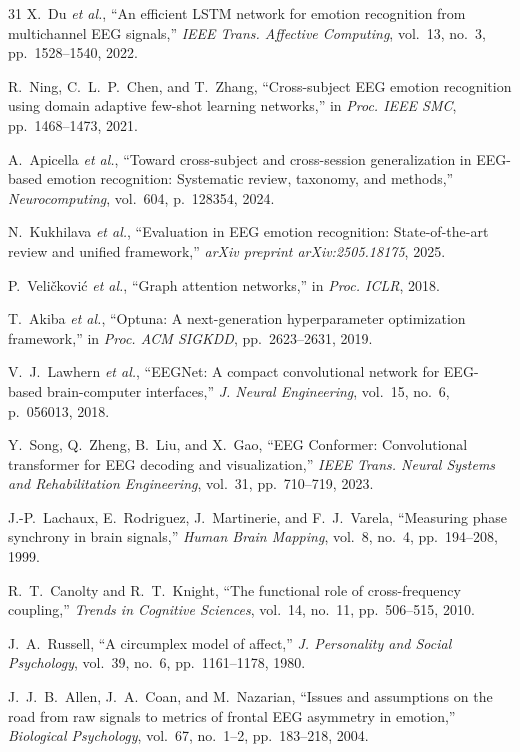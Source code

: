 \documentclass[conference,a4paper]{IEEEtran}
\begin{document}
\begin{thebibliography}{31}
X.~Du \emph{et al.}, ``An efficient LSTM network for emotion recognition from multichannel EEG signals,'' \emph{IEEE Trans. Affective Computing}, vol.~13, no.~3, pp.~1528--1540, 2022.

R.~Ning, C.~L.~P.~Chen, and T.~Zhang, ``Cross-subject EEG emotion recognition using domain adaptive few-shot learning networks,'' in \emph{Proc. IEEE SMC}, pp.~1468--1473, 2021.

A.~Apicella \emph{et al.}, ``Toward cross-subject and cross-session generalization in EEG-based emotion recognition: Systematic review, taxonomy, and methods,'' \emph{Neurocomputing}, vol.~604, p.~128354, 2024.

N.~Kukhilava \emph{et al.}, ``Evaluation in EEG emotion recognition: State-of-the-art review and unified framework,'' \emph{arXiv preprint arXiv:2505.18175}, 2025.

P.~Veli\v{c}kovi\'{c} \emph{et al.}, ``Graph attention networks,'' in \emph{Proc. ICLR}, 2018.

T.~Akiba \emph{et al.}, ``Optuna: A next-generation hyperparameter optimization framework,'' in \emph{Proc. ACM SIGKDD}, pp.~2623--2631, 2019.

V.~J.~Lawhern \emph{et al.}, ``EEGNet: A compact convolutional network for EEG-based brain-computer interfaces,'' \emph{J. Neural Engineering}, vol.~15, no.~6, p.~056013, 2018.

Y.~Song, Q.~Zheng, B.~Liu, and X.~Gao, ``EEG Conformer: Convolutional transformer for EEG decoding and visualization,'' \emph{IEEE Trans. Neural Systems and Rehabilitation Engineering}, vol.~31, pp.~710--719, 2023.

J.-P.~Lachaux, E.~Rodriguez, J.~Martinerie, and F.~J.~Varela, ``Measuring phase synchrony in brain signals,'' \emph{Human Brain Mapping}, vol.~8, no.~4, pp.~194--208, 1999.

R.~T.~Canolty and R.~T.~Knight, ``The functional role of cross-frequency coupling,'' \emph{Trends in Cognitive Sciences}, vol.~14, no.~11, pp.~506--515, 2010.

J.~A.~Russell, ``A circumplex model of affect,'' \emph{J. Personality and Social Psychology}, vol.~39, no.~6, pp.~1161--1178, 1980.

J.~J.~B.~Allen, J.~A.~Coan, and M.~Nazarian, ``Issues and assumptions on the road from raw signals to metrics of frontal EEG asymmetry in emotion,'' \emph{Biological Psychology}, vol.~67, no.~1--2, pp.~183--218, 2004.


\end{thebibliography}
\end{document}
